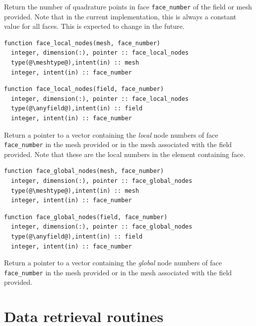 \documentclass[a4paper, 11pt]{book}
\begin{document}
Return the number of quadrature points in face \lstinline+face_number+ of the field
or mesh provided. Note that in the current implementation, this is always a
constant value for all faces. This is expected to change in the future.


\begin{lstlisting}
function face_local_nodes(mesh, face_number)
  integer, dimension(:), pointer :: face_local_nodes
  type(@\meshtype@),intent(in) :: mesh
  integer, intent(in) :: face_number  
\end{lstlisting}

\begin{lstlisting}
function face_local_nodes(field, face_number)
  integer, dimension(:), pointer :: face_local_nodes
  type(@\anyfield@),intent(in) :: field
  integer, intent(in) :: face_number  
\end{lstlisting}

Return a pointer to a vector containing the \emph{local} node numbers of
face \lstinline+face_number+ in the  mesh provided or in the mesh
associated with the field provided. Note that these are the local numbers in
the element containing face.


\begin{lstlisting}
function face_global_nodes(mesh, face_number)
  integer, dimension(:), pointer :: face_global_nodes
  type(@\meshtype@),intent(in) :: mesh
  integer, intent(in) :: face_number  
\end{lstlisting}

\begin{lstlisting}
function face_global_nodes(field, face_number)
  integer, dimension(:), pointer :: face_global_nodes
  type(@\anyfield@),intent(in) :: field
  integer, intent(in) :: face_number  
\end{lstlisting}

Return a pointer to a vector containing the \emph{global} node numbers of
face \lstinline+face_number+ in the  mesh provided or in the mesh
associated with the field provided. 

\section{Data retrieval routines}

\end{document}
